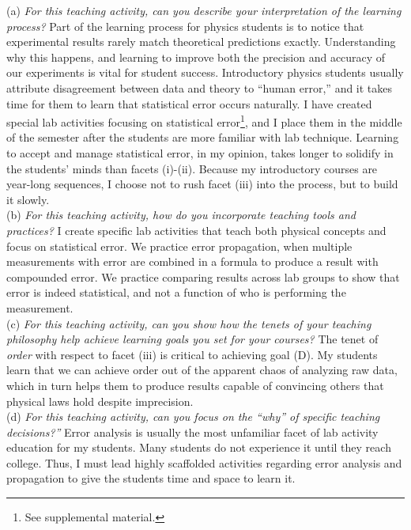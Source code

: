 \documentclass[../../../main.tex]{subfiles}
\begin{document}
\vspace{0.25cm}
(a) \textit{For this teaching activity, can you describe your interpretation of the learning process?}  Part of the learning process for physics students is to notice that experimental results rarely match theoretical predictions exactly.  Understanding why this happens, and learning to improve both the precision and accuracy of our experiments is vital for student success.  Introductory physics students usually attribute disagreement between data and theory to ``human error,'' and it takes time for them to learn that statistical error occurs naturally.  I have created special lab activities focusing on statistical error\footnote{See supplemental material.}, and I place them in the middle of the semester after the students are more familiar with lab technique.  Learning to accept and manage statistical error, in my opinion, takes longer to solidify in the students' minds than facets (i)-(ii).  Because my introductory courses are year-long sequences, I choose not to rush facet (iii) into the process, but to build it slowly.
\\
\vspace{0.25cm}
(b) \textit{For this teaching activity, how do you incorporate teaching tools and practices?}  I create specific lab activities that teach both physical concepts and focus on statistical error.  We practice error propagation, when multiple measurements with error are combined in a formula to produce a result with compounded error.  We practice comparing results across lab groups to show that error is indeed statistical, and not a function of who is performing the measurement.
\\
\vspace{0.25cm}
(c) \textit{For this teaching activity, can you show how the tenets of your teaching philosophy help achieve learning goals you
set for your courses?}  The tenet of \textit{order} with respect to facet (iii) is critical to achieving goal (D).  My students learn that we can achieve order out of the apparent chaos of analyzing raw data, which in turn helps them to produce results capable of convincing others that physical laws hold despite imprecision.
\\
\vspace{0.25cm}
(d) \textit{For this teaching activity, can you focus on the ``why'' of specific teaching decisions?''} Error analysis is usually the most unfamiliar facet of lab activity education for my students.  Many students do not experience it until they reach college.  Thus, I must lead highly scaffolded activities regarding error analysis and propagation to give the students time and space to learn it.
\end{document}
